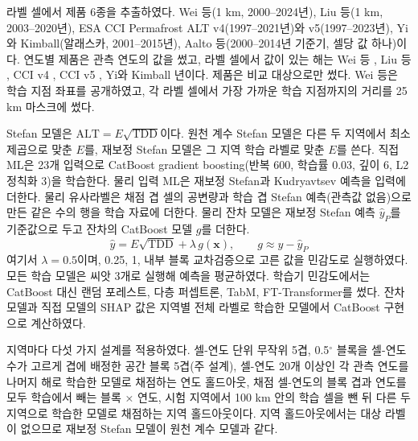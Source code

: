 라벨 셀에서 제품 6종을 추출하였다. Wei 등\cite{Wei2026}(1 km, 2000--2024년), Liu 등\cite{Liu2024}(1 km, 2003--2020년), ESA CCI Permafrost ALT v4(1997--2021년)와 v5(1997--2023년)\cite{Westermann2024,Westermann2025}, Yi와 Kimball\cite{YiKimball2019}(알래스카, 2001--2015년), Aalto 등\cite{Aalto2018}(2000--2014년 기준기, 셀당 값 하나)이다. 연도별 제품은 관측 연도의 값을 썼고, 라벨 셀에서 값이 있는 해는 Wei 등 \nyrsprodWei, Liu 등 \nyrsprodLiu, CCI v4 \nyrsprodCcifour, CCI v5 \nyrsprodCcifive, Yi와 Kimball \nyrsprodYk{}년이다. 제품은 비교 대상으로만 썼다. Wei 등은 학습 지점 좌표를 공개하였고, 각 라벨 셀에서 가장 가까운 학습 지점까지의 거리를 25 km 마스크에 썼다.

Stefan 모델은 $\mathrm{ALT}=E\sqrt{\mathrm{TDD}}$이다\cite{Stefan1891}. 원천 계수 Stefan 모델은 다른 두 지역에서 최소제곱으로 맞춘 $E$를, 재보정 Stefan 모델은 그 지역 학습 라벨로 맞춘 $E$를 쓴다. 직접 ML은 23개 입력으로 CatBoost gradient boosting\cite{Prokhorenkova2018}(반복 600, 학습률 0.03, 깊이 6, L2 정칙화 3)을 학습한다. 물리 입력 ML은 재보정 Stefan과 Kudryavtsev\cite{Kudryavtsev1974} 예측을 입력에 더한다. 물리 유사라벨은 채점 겹 셀의 공변량과 학습 겹 Stefan 예측(관측값 없음)으로 만든 같은 수의 행을 학습 자료에 더한다. 물리 잔차 모델은 재보정 Stefan 예측 $\hat{y}_P$를 기준값으로 두고 잔차의 CatBoost 모델 $g$를 더한다.
\begin{equation}
\hat{y} = E\sqrt{\mathrm{TDD}} + \lambda\, g(\mathbf{x}), \qquad g \approx y - \hat{y}_P
\end{equation}
여기서 $\lambda = 0.5$이며, 0.25, 1, 내부 블록 교차검증으로 고른 값을 민감도로 실행하였다. 모든 학습 모델은 씨앗 3개로 실행해 예측을 평균하였다. 학습기 민감도에서는 CatBoost 대신 랜덤 포레스트, 다층 퍼셉트론, TabM, FT-Transformer\cite{Gorishniy2021,Gorishniy2025,Holzmuller2024}를 썼다. 잔차 모델과 직접 모델의 SHAP 값\cite{Lundberg2017}은 지역별 전체 라벨로 학습한 모델에서 CatBoost 구현으로 계산하였다.

지역마다 다섯 가지 설계를 적용하였다\cite{Roberts2017,Ploton2020}. 셀-연도 단위 무작위 5겹, 0.5$^\circ$ 블록을 셀-연도 수가 고르게 겹에 배정한 공간 블록 5겹(주 설계), 셀-연도 20개 이상인 각 관측 연도를 나머지 해로 학습한 모델로 채점하는 연도 홀드아웃, 채점 셀-연도의 블록 겹과 연도를 모두 학습에서 빼는 블록 × 연도, 시험 지역에서 100 km 안의 학습 셀을 뺀 뒤 다른 두 지역으로 학습한 모델로 채점하는 지역 홀드아웃이다. 지역 홀드아웃에서는 대상 라벨이 없으므로 재보정 Stefan 모델이 원천 계수 모델과 같다.

